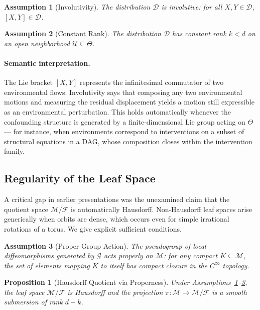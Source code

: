 \documentclass[11pt,a4paper]{article}
\newtheorem{proposition}[theorem]{Proposition}
\newtheorem{assumption}{Assumption}
\newcommand{\cM}{\mathcal{M}}
\newcommand{\cF}{\mathcal{F}}
\newcommand{\cG}{\mathcal{G}}
\newcommand{\cD}{\mathcal{D}}
\begin{document}
\begin{assumption}[Involutivity]\label{ass:involutive}
The distribution $\cD$ is involutive: for all $X, Y \in \cD$, $[X, Y] \in \cD$.
\end{assumption}

\begin{assumption}[Constant Rank]\label{ass:rank}
The distribution $\cD$ has constant rank $k < d$ on an open neighborhood $\mathcal{U} \subseteq \Theta$.
\end{assumption}

\paragraph{Semantic interpretation.} The Lie bracket $[X, Y]$ represents the infinitesimal commutator of two environmental flows. Involutivity says that composing any two environmental motions and measuring the residual displacement yields a motion still expressible as an environmental perturbation. This holds automatically whenever the confounding structure is generated by a finite-dimensional Lie group acting on $\Theta$ — for instance, when environments correspond to interventions on a subset of structural equations in a DAG, whose composition closes within the intervention family.

\subsection{Regularity of the Leaf Space}

A critical gap in earlier presentations was the unexamined claim that the quotient space $\cM/\cF$ is automatically Hausdorff. Non-Hausdorff leaf spaces arise generically when orbits are dense, which occurs even for simple irrational rotations of a torus. We give explicit sufficient conditions.

\begin{assumption}[Proper Group Action]\label{ass:proper}
The pseudogroup of local diffeomorphisms generated by $\cG$ acts \emph{properly} on $\cM$: for any compact $K \subseteq \cM$, the set of elements mapping $K$ to itself has compact closure in the $C^\infty$ topology.
\end{assumption}

\begin{proposition}[Hausdorff Quotient via Properness]\label{prop:hausdorff}
Under Assumptions~\ref{ass:involutive}--\ref{ass:proper}, the leaf space $\cM/\cF$ is Hausdorff and the projection $\pi: \cM \to \cM/\cF$ is a smooth submersion of rank $d - k$.
\end{proposition}
\end{document}
